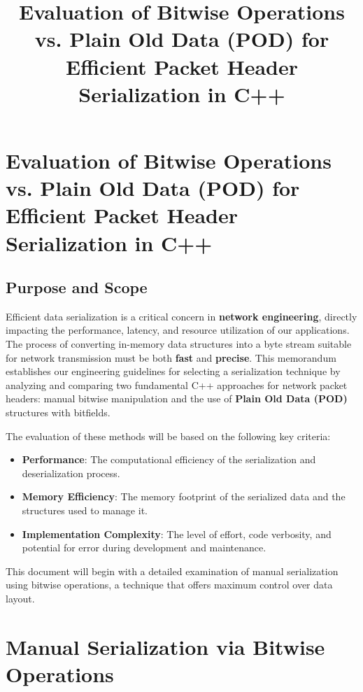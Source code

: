 \documentclass{article}
\title{Evaluation of Bitwise Operations vs. Plain Old Data (POD) for Efficient Packet Header Serialization in C++}
\begin{document}
\maketitle
\newpage
\tableofcontents
\newpage

\section{Evaluation of Bitwise Operations vs. Plain Old Data (POD) for Efficient Packet Header Serialization in C++}

\subsection{Purpose and Scope}

Efficient data serialization is a critical concern in \textbf{network engineering}, directly impacting the performance, latency, and resource utilization of our applications. The process of converting in-memory data structures into a byte stream suitable for network transmission must be both \textbf{fast} and \textbf{precise}. This memorandum establishes our engineering guidelines for selecting a serialization technique by analyzing and comparing two fundamental C++ approaches for network packet headers: manual bitwise manipulation and the use of \textbf{Plain Old Data (POD)} structures with bitfields.

The evaluation of these methods will be based on the following key criteria:

\begin{itemize}
    \item \textbf{Performance}: The computational efficiency of the serialization and deserialization process.
    \item \textbf{Memory Efficiency}: The memory footprint of the serialized data and the structures used to manage it.
    \item \textbf{Implementation Complexity}: The level of effort, code verbosity, and potential for error during development and maintenance.
\end{itemize}

This document will begin with a detailed examination of manual serialization using bitwise operations, a technique that offers maximum control over data layout.

\section{Manual Serialization via Bitwise Operations}
\end{document}
